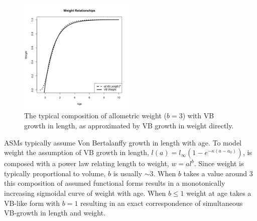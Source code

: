 %
\begin{figure} %
\vspace{-1.5cm}
\includegraphics[width=0.49\textwidth]{plots/vbOpt.png}
\vspace{-1cm}
\caption{
The typical composition of allometric weight ($b=3$) with VB growth in length, as
approximated by VB growth in weight directly.
}
\label{vbComp}
\end{figure}

ASMs typically assume Von Bertalanffy %
\cite[VB]{von_bertalanffy_quantitative_1938} growth in length with age. To model
weight the assumption of VB growth in length, 
$l(a)=l_\infty(1-e^{-\kappa (a-a_0)})$, 
is composed with a power law relating length to weight, $w=al^b$. 
%
Since weight is typically proportional to volume, $b$ is usually $\sim3$. When 
$b$ takes a value around $3$ this composition of assumed functional forms %
results in a monotonically increasing sigmoidal curve of weight with 
age. When $b\le1$ weight at age takes a VB-like form with $b=1$ resulting in
an exact correspondence of simultaneous VB-growth in length and weight.

